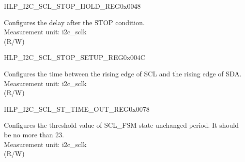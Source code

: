 \begin{register}{H}{LP\_I2C\_SCL\_STOP\_HOLD\_REG}{0x0048}\label{regdesc:LPI2CSCLSTOPHOLDREG}
%
%
\regnewline%
\begin{regdesc}\begin{reglist}
\label{fielddesc:LPI2CSCLSTOPHOLDTIME}\item [LP\_I2C\_SCL\_STOP\_HOLD\_TIME] Configures the delay after the STOP condition.\\
Measurement unit: i2c\_sclk \\ (R/W)
\end{reglist}\end{regdesc}
\end{register}


\begin{register}{H}{LP\_I2C\_SCL\_STOP\_SETUP\_REG}{0x004C}\label{regdesc:LPI2CSCLSTOPSETUPREG}
%
%
\regnewline%
\begin{regdesc}\begin{reglist}
\label{fielddesc:LPI2CSCLSTOPSETUPTIME}\item [LP\_I2C\_SCL\_STOP\_SETUP\_TIME] Configures the time between the rising edge of SCL and the rising edge of SDA.\\
Measurement unit: i2c\_sclk \\ (R/W)
\end{reglist}\end{regdesc}
\end{register}


\begin{register}{H}{LP\_I2C\_SCL\_ST\_TIME\_OUT\_REG}{0x0078}\label{regdesc:LPI2CSCLSTTIMEOUTREG}
%
%
\regnewline%
\begin{regdesc}\begin{reglist}
\label{fielddesc:LPI2CSCLSTTOI2C}\item [LP\_I2C\_SCL\_ST\_TO\_I2C] Configures the threshold value of SCL\_FSM state unchanged period. It should be no more than 23.\\
Measurement unit: i2c\_sclk \\ (R/W)
\end{reglist}\end{regdesc}
\end{register}


